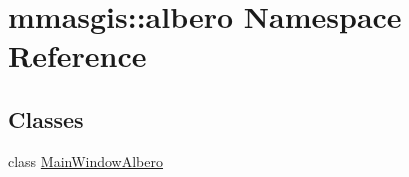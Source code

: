 \hypertarget{namespacemmasgis_1_1albero}{
\section{mmasgis::albero Namespace Reference}
\label{namespacemmasgis_1_1albero}
}
\subsection*{Classes}
\begin{DoxyCompactItemize}
\item 
class \hyperlink{classmmasgis_1_1albero_1_1MainWindowAlbero}{MainWindowAlbero}
\end{DoxyCompactItemize}
